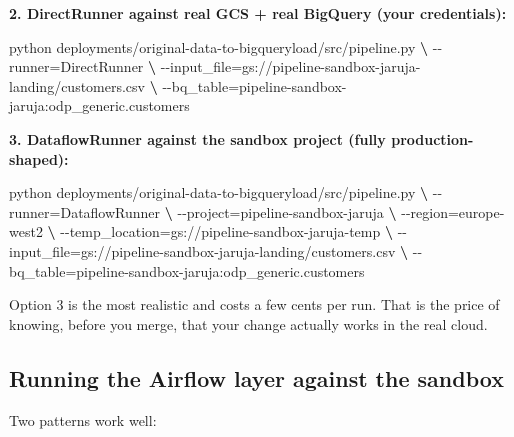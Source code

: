 \documentclass[
  11pt,
  british,
  oneside]{book}
\newenvironment{Shaded}{\begin{snugshade}}{\end{snugshade}}
\newcommand{\ExtensionTok}[1]{#1}
\newcommand{\KeywordTok}[1]{\textcolor[rgb]{0.13,0.29,0.53}{\textbf{#1}}}
\newcommand{\NormalTok}[1]{#1}
\begin{document}
\textbf{2. DirectRunner against real GCS + real BigQuery (your
credentials):}

\begin{Shaded}
\begin{Highlighting}[]
\ExtensionTok{python}\NormalTok{ deployments/original{-}data{-}to{-}bigqueryload/src/pipeline.py }\KeywordTok{\textbackslash{}}
  \ExtensionTok{{-}{-}runner}\NormalTok{=DirectRunner }\KeywordTok{\textbackslash{}}
  \ExtensionTok{{-}{-}input\_file}\NormalTok{=gs://pipeline{-}sandbox{-}jaruja{-}landing/customers.csv }\KeywordTok{\textbackslash{}}
  \ExtensionTok{{-}{-}bq\_table}\NormalTok{=pipeline{-}sandbox{-}jaruja:odp\_generic.customers}
\end{Highlighting}
\end{Shaded}

\textbf{3. DataflowRunner against the sandbox project (fully
production-shaped):}

\begin{Shaded}
\begin{Highlighting}[]
\ExtensionTok{python}\NormalTok{ deployments/original{-}data{-}to{-}bigqueryload/src/pipeline.py }\KeywordTok{\textbackslash{}}
  \ExtensionTok{{-}{-}runner}\NormalTok{=DataflowRunner }\KeywordTok{\textbackslash{}}
  \ExtensionTok{{-}{-}project}\NormalTok{=pipeline{-}sandbox{-}jaruja }\KeywordTok{\textbackslash{}}
  \ExtensionTok{{-}{-}region}\NormalTok{=europe{-}west2 }\KeywordTok{\textbackslash{}}
  \ExtensionTok{{-}{-}temp\_location}\NormalTok{=gs://pipeline{-}sandbox{-}jaruja{-}temp }\KeywordTok{\textbackslash{}}
  \ExtensionTok{{-}{-}input\_file}\NormalTok{=gs://pipeline{-}sandbox{-}jaruja{-}landing/customers.csv }\KeywordTok{\textbackslash{}}
  \ExtensionTok{{-}{-}bq\_table}\NormalTok{=pipeline{-}sandbox{-}jaruja:odp\_generic.customers}
\end{Highlighting}
\end{Shaded}

Option 3 is the most realistic and costs a few cents per run. That is
the price of knowing, before you merge, that your change actually works
in the real cloud.

\hypertarget{running-the-airflow-layer-against-the-sandbox}{%
\subsection{Running the Airflow layer against the
sandbox}\label{running-the-airflow-layer-against-the-sandbox}}

Two patterns work well:
\end{document}
